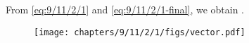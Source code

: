 		From 
		\eqref{eq:9/11/2/1}
		and 
		\eqref{eq:9/11/2/1-final},
		we obtain
		.
		\iffalse
		See
\begin{lstlisting}
	codes/triangle/const-aBsum.py
\end{lstlisting}
\fi
	\begin{figure}[H]
		\centering
 \texttt{[image: chapters/9/11/2/1/figs/vector.pdf]}
		\caption{}
		\label{fig:9/11/2/1}
  	\end{figure}
	
